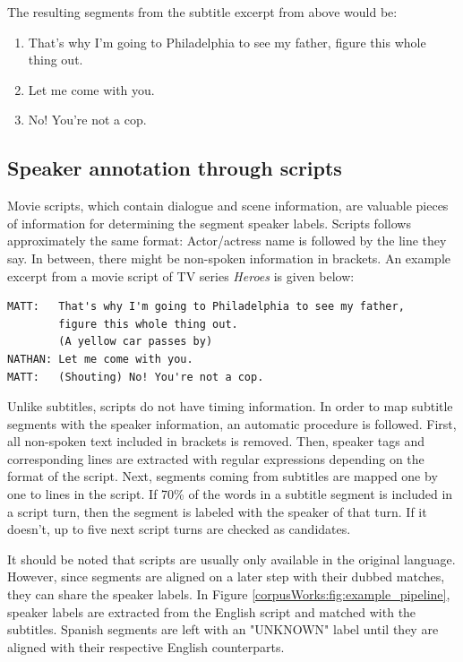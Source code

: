 The resulting segments from the subtitle excerpt from above would be:
\begin{enumerate}
    \item That's why I'm going to Philadelphia to see my father, figure this whole thing out.
    \item Let me come with you.
    \item No! You're not a cop.
\end{enumerate}

\subsection*{Speaker annotation through scripts}
Movie scripts, which contain dialogue and scene information, are valuable pieces of information for determining the segment speaker labels. Scripts follows approximately the same format: Actor/actress name is followed by the line they say. In between, there might be non-spoken information in brackets. An example excerpt from a movie script of TV series \textit{Heroes} is given below:

\begin{lstlisting}
MATT:   That's why I'm going to Philadelphia to see my father, 
        figure this whole thing out.
        (A yellow car passes by)
NATHAN: Let me come with you.
MATT:   (Shouting) No! You're not a cop.
\end{lstlisting}

Unlike subtitles, scripts do not have timing information. In order to map subtitle segments with the speaker information, an automatic procedure is followed. First, all non-spoken text included in brackets is removed. Then, speaker tags and corresponding lines are extracted with regular expressions depending on the format of the script. Next, segments coming from subtitles are mapped one by one to lines in the script. If 70\% of the words in a subtitle segment is included in a script turn, then the segment is labeled with the speaker of that turn. If it doesn't, up to five next script turns are checked as candidates. 

It should be noted that scripts are usually only available in the original language. However, since segments are aligned on a later step with their dubbed matches, they can share the speaker labels. In Figure \ref{corpusWorks:fig:example_pipeline}, speaker labels are extracted from the English script and matched with the subtitles. Spanish segments are left with an "UNKNOWN" label until they are aligned with their respective English counterparts. 

